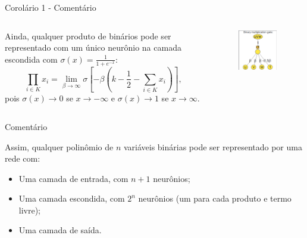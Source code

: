 \documentclass{beamer}
\begin{document}
\begin{frame}{Corolário 1 - Comentário}
    \small
    \begin{columns}
        \begin{column}{0.6\textwidth}
            Ainda, qualquer produto de binários pode ser representado com um único neurônio na camada escondida com $\sigma(x) = \frac{1}{1+e^{-x}}$:
            \[
                \prod_{i \in K} x_i = \lim_{\beta \to \infty} \sigma \left[ -\beta \left( k - \frac{1}{2} - \sum_{i \in K} x_i \right) \right],
            \]
            pois $\sigma(x)\to 0$ se $x\to -\infty$ e $\sigma(x) \to 1$ se $x\to \infty$.
            
        \end{column}    
        \begin{column}{0.4\textwidth}
            \pause
            \begin{figure}
                \includegraphics[width=0.9\textwidth]{fig/binproductgate.png}
            \end{figure}
        
        \end{column}
    \end{columns}

    
\end{frame}

\begin{frame}{Comentário}
    
    Assim, qualquer polinômio de $n$ variáveis binárias pode ser representado por uma rede com:

    \begin{itemize}
        \item Uma camada de entrada, com $n+1$ neurônios;
        \item Uma camada escondida, com $2^n$ neurônios (um para cada produto e termo livre);
        \item Uma camada de saída.
    \end{itemize}
 
\end{frame}
\end{document}

